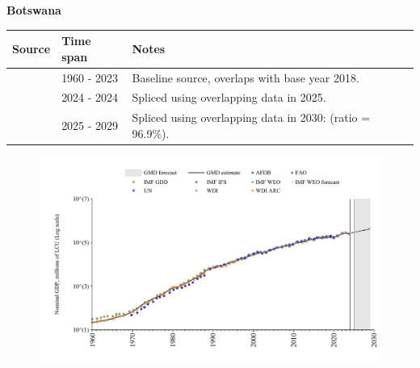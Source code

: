 \documentclass[12pt,a4paper,landscape]{article}
\begin{document}
\begin{adjustbox}{max totalsize={\paperwidth}{\paperheight},center}
\begin{minipage}[t][\textheight][t]{\textwidth}
\vspace*{0.5cm}
{}
\begin{center}
{\Large\bfseries Botswana}
\end{center}
\vspace{0.5cm}
\begin{table}[H]
\centering
\small
\begin{tabular}{|l|l|l|}
\hline
\textbf{Source} & \textbf{Time span} & \textbf{Notes} \\
\hline
\rowcolor{white}\cite{WDI}& 1960 - 2023 &Baseline source, overlaps with base year 2018.\\
\rowcolor{lightgray}\cite{IMF_IFS}& 2024 - 2024 &Spliced using overlapping data in 2025.\\
\rowcolor{white}\cite{IMF_WEO_forecast}& 2025 - 2029 &Spliced using overlapping data in 2030: (ratio = 96.9\%).\\
\hline
\end{tabular}
\end{table}
\begin{figure}[H]
\centering
\includegraphics[width=\textwidth,height=0.6\textheight,keepaspectratio]{graphs/BWA_nGDP.pdf}
\end{figure}
\end{minipage}
\end{adjustbox}
\end{document}
